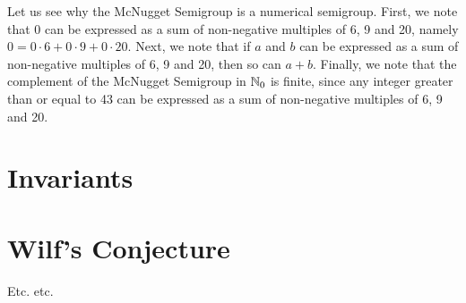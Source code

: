 Let us see why the McNugget Semigroup is a numerical semigroup. First, we note that $0$ can be expressed as a sum of non-negative multiples of 6, 9 and 20, namely $0 = 0 \cdot 6 + 0 \cdot 9 + 0 \cdot 20$. Next, we note that if $a$ and $b$ can be expressed as a sum of non-negative multiples of 6, 9 and 20, then so can $a + b$. Finally, we note that the complement of the McNugget Semigroup in $\mathbb{N}_0$ is finite, since any integer greater than or equal to 43 can be expressed as a sum of non-negative multiples of 6, 9 and 20. \par

\section{Invariants}\label{sec:smgps:theme1}

\begin{definition}[Multiplicity]
    
\end{definition}



\begin{definition}
\end{definition}

\begin{definition}
\end{definition}

\begin{definition}

\end{definition}


\begin{definition}[Genus]

\end{definition}

\section{Wilf's Conjecture}\label{sec:smgps:theme2}

Etc. etc.

